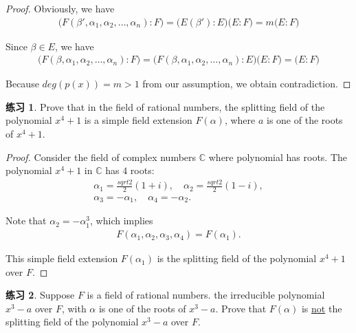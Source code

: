 \documentclass[utf8]{ctexbook}
\theoremstyle{definition}
\newtheorem{exercise}{练习}[section]
\begin{document}
\begin{proof}
Obviously, we have
\begin{align*}
\big( F(\beta', \alpha_1, \alpha_2, \ldots, \alpha_n) : F \big)  = \big( E(\beta') : E \big) \big( E: F \big) = m \big( E:F \big)
\end{align*}

Since $\beta \in E $, we have
\begin{align*}
\big( F(\beta, \alpha_1, \alpha_2, \ldots, \alpha_n) : F\big) = \big( F(\beta, \alpha_1, \alpha_2, \ldots, \alpha_n) : E \big) \big( E : F \big) =  \big( E : F \big)
\end{align*}

Because $deg(p(x)) = m > 1$ from our assumption, we obtain contradiction. 

\end{proof}


\begin{exercise}
Prove that in the field of rational numbers, the splitting field of the polynomial $x^4 + 1 $ is a simple field extension $F(\alpha)$, where $a$ is one of the roots of $x^4 + 1$. 
\end{exercise}

\begin{proof}
Consider the field of complex numbers $\mathbb{C}$ where polynomial has roots. The polynomial $x^4 + 1$ in $\mathbb{C}$ has $4$ roots:
\begin{align*}
\alpha_1 = \frac{sqrt{2}}{2} ( 1 + i), \quad \alpha_2 = \frac{sqrt{2}}{2} ( 1 - i), \\
\alpha_3 = - \alpha_1, \quad \alpha_4 = - \alpha_2 .
\end{align*}

Note that $\alpha_2 = - \alpha_1 ^3$, which implies 
\begin{align*}
F(\alpha_1, \alpha_2, \alpha_3, \alpha_4) = F(\alpha_1).
\end{align*}

This simple field extension $F(\alpha_1)$ is the splitting field of the polynomial $x^4 + 1$ over $F$.
\end{proof}


\begin{exercise}
Suppose $F$ is a field of rational numbers. the irreducible polynomial $x^3 - a$ over $F$, with $\alpha$ is one of the roots of $x^3 - a$. Prove that $F(\alpha)$ is \underline{not} the splitting field of the polynomial $x^3 - a$ over $F$.
\end{exercise}
\end{document}
